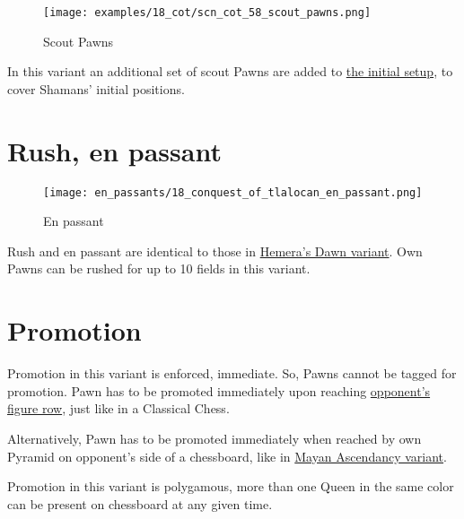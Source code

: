 \vspace*{-1.2\baselineskip}
\noindent
\begin{figure}[!h]
\texttt{[image: examples/18\_cot/scn\_cot\_58\_scout\_pawns.png]}
\caption{Scout Pawns}
\label{fig:scn_cot_58_scout_pawns}
\end{figure}

In this variant an additional set of scout Pawns are added to
\hyperref[fig:18_conquest_of_tlalocan]{the initial setup},
to cover Shamans' initial positions.

\clearpage %

\section*{Rush, en passant}
\label{sec:Conquest of Tlalocan/Rush, en passant}

\vspace*{-1.2\baselineskip}
\noindent
\begin{figure}[!h]
\texttt{[image: en\_passants/18\_conquest\_of\_tlalocan\_en\_passant.png]}
\caption{En passant}
\label{fig:18_conquest_of_tlalocan_en_passant}
\end{figure}

Rush and en passant are identical to those in
\hyperref[fig:14_hemera_s_dawn_en_passant]{Hemera's Dawn variant}.
Own Pawns can be rushed for up to 10 fields in this variant.

\clearpage %

\section*{Promotion}
\label{sec:Conquest of Tlalocan/Promotion}

Promotion in this variant is enforced, immediate. So, Pawns cannot be tagged
for promotion. Pawn has to be promoted immediately upon reaching
\hyperref[sec:Terms/Figure row]{opponent's figure row},
just like in a Classical Chess.

Alternatively, Pawn has to be promoted immediately when reached by own Pyramid
on opponent's side of a chessboard, like in
\hyperref[sec:Mayan Ascendancy/Pyramid/Promotion]{Mayan Ascendancy variant}.

Promotion in this variant is polygamous, more than one Queen in the same color
can be present on chessboard at any given time.

